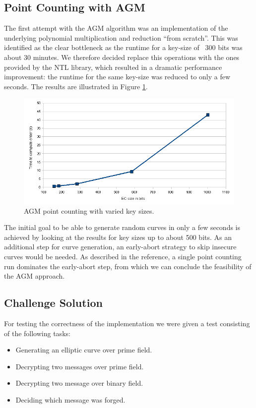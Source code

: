 \documentclass[11pt,english]{article}
\begin{document}
\subsection{Point Counting with AGM}
The first attempt with the AGM algorithm was an implementation of the underlying polynomial multiplication and reduction ``from scratch''. This was identified as the clear bottleneck as the runtime for a key-size of ~300 bits was about 30 minutes. We therefore decided replace this operations with the ones provided by the NTL library, which resulted in a dramatic performance improvement: the runtime for the same key-size was reduced to only a few seconds. The results are illustrated in Figure \ref{figure:agm}.

\label{agmres}
\begin{figure}[h]
\centering
\includegraphics[scale=0.6]{dia1.png}
\caption{AGM point counting with varied key sizes.}
\label{figure:agm}
\end{figure}

The initial goal to be able to generate random curves in only a few seconds is achieved by looking at the results for key sizes up to about 500 bits. As an additional step for curve generation, an early-abort strategy to skip insecure curves \cite{satohfgh} would be needed. As described in the reference, a single point counting run dominates the early-abort step, from which we can conclude the feasibility of the AGM approach.

\subsection{Challenge Solution}
For testing the correctness of the implementation we were given a test consisting of the following tasks:

\begin{itemize}
 \item Generating an elliptic curve over prime field.
 \item Decrypting two messages over prime field.
 \item Decrypting two message over binary field.
 \item Deciding which message was forged.
\end{itemize}
\end{document}
